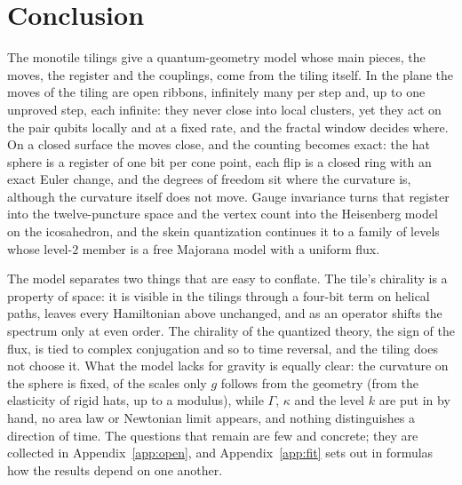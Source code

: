 \documentclass[11pt]{article}
\theoremstyle{definition}
\begin{document}
\section{Conclusion}\label{sec:conclusion}
The monotile tilings give a quantum-geometry model whose main pieces, the moves, the register and the couplings, come from the tiling itself. In the plane the moves of the tiling are open ribbons, infinitely many per step and, up to one unproved step, each infinite: they never close into local clusters, yet they act on the pair qubits locally and at a fixed rate, and the fractal window decides where. On a closed surface the moves close, and the counting becomes exact: the hat sphere is a register of one bit per cone point, each flip is a closed ring with an exact Euler change, and the degrees of freedom sit where the curvature is, although the curvature itself does not move. Gauge invariance turns that register into the twelve-puncture space and the vertex count into the Heisenberg model on the icosahedron, and the skein quantization continues it to a family of levels whose level-$2$ member is a free Majorana model with a uniform flux.

The model separates two things that are easy to conflate. The tile's chirality is a property of space: it is visible in the tilings through a four-bit term on helical paths, leaves every Hamiltonian above unchanged, and as an operator shifts the spectrum only at even order. The chirality of the quantized theory, the sign of the flux, is tied to complex conjugation and so to time reversal, and the tiling does not choose it. What the model lacks for gravity is equally clear: the curvature on the sphere is fixed, of the scales only $g$ follows from the geometry (from the elasticity of rigid hats, up to a modulus), while $\Gamma$, $\kappa$ and the level $k$ are put in by hand, no area law or Newtonian limit appears, and nothing distinguishes a direction of time. The questions that remain are few and concrete; they are collected in Appendix~\ref{app:open}, and Appendix~\ref{app:fit} sets out in formulas how the results depend on one another.

\appendix
\end{document}
